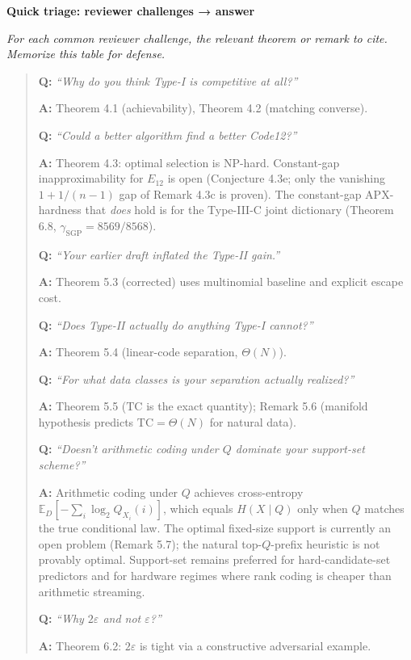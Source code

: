 \documentclass[
]{article}
\begin{document}
\textbf{Quick triage: reviewer challenges → answer}

\emph{For each common reviewer challenge, the relevant theorem or remark
to cite. Memorize this table for defense.}

\begin{quote}
\textbf{Q:} \emph{``Why do you think Type-I is competitive at all?''}

\textbf{A:} Theorem 4.1 (achievability), Theorem 4.2 (matching
converse).

\textbf{Q:} \emph{``Could a better algorithm find a better Code12?''}

\textbf{A:} Theorem 4.3: optimal selection is NP-hard. Constant-gap
inapproximability for $E_{12}$ is open (Conjecture 4.3e; only the
vanishing $1+1/(n-1)$ gap of Remark 4.3c is proven). The constant-gap
APX-hardness that \emph{does} hold is for the Type-III-C joint dictionary
(Theorem 6.8, $\gamma_{\mathrm{SGP}} = 8569/8568$).

\textbf{Q:} \emph{``Your earlier draft inflated the Type-II gain.''}

\textbf{A:} Theorem 5.3 (corrected) uses multinomial baseline and
explicit escape cost.

\textbf{Q:} \emph{``Does Type-II actually do anything Type-I cannot?''}

\textbf{A:} Theorem 5.4 (linear-code separation, $\Theta(N)$).

\textbf{Q:} \emph{``For what data classes is your separation
actually realized?''}

\textbf{A:} Theorem 5.5 ($\mathrm{TC}$ is the exact quantity);
Remark 5.6 (manifold hypothesis predicts
$\mathrm{TC} = \Theta(N)$ for natural data).

\textbf{Q:} \emph{``Doesn't arithmetic coding under $Q$ dominate
your support-set scheme?''}

\textbf{A:} Arithmetic coding under $Q$ achieves cross-entropy
$\mathbb{E}_D[-\sum_i \log_2 Q_{X_i}(i)]$, which equals $H(X \mid Q)$
only when $Q$ matches the true conditional law. The optimal
fixed-size support is currently an open problem (Remark 5.7); the
natural top-$Q$-prefix heuristic is not provably optimal. Support-set
remains preferred for hard-candidate-set predictors and for hardware
regimes where rank coding is cheaper than arithmetic streaming.

\textbf{Q:} \emph{``Why $2\varepsilon$ and not $\varepsilon$?''}

\textbf{A:} Theorem 6.2: $2\varepsilon$ is tight via a constructive
adversarial example.


\end{quote}
\end{document}
